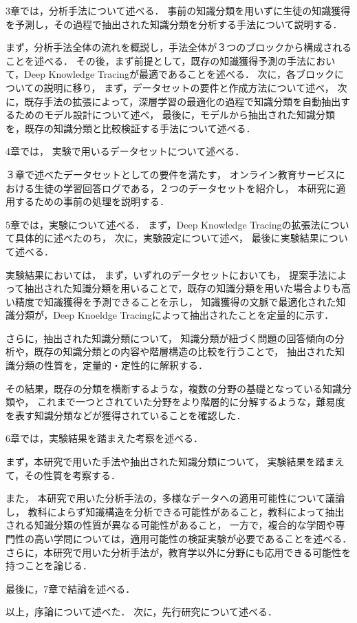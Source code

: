 3章では，分析手法について述べる．
事前の知識分類を用いずに生徒の知識獲得を予測し，その過程で抽出された知識分類を分析する手法について説明する．

まず，分析手法全体の流れを概説し，手法全体が３つのブロックから構成されることを述べる．
その後，まず前提として，既存の知識獲得予測の手法において，Deep Knowledge Tracingが最適であることを述べる．
次に，各ブロックについての説明に移り，
まず，データセットの要件と作成方法について述べ，
次に，既存手法の拡張によって，深層学習の最適化の過程で知識分類を自動抽出するためのモデル設計について述べ，
最後に，モデルから抽出された知識分類を，既存の知識分類と比較検証する手法について述べる．


4章では，
実験で用いるデータセットについて述べる．

３章で述べたデータセットとしての要件を満たす，
オンライン教育サービスにおける生徒の学習回答ログである，２つのデータセットを紹介し，
本研究に適用するための事前の処理を説明する．


5章では，実験について述べる．
まず，Deep Knowledge Tracingの拡張法について具体的に述べたのち，
次に，実験設定について述べ，
最後に実験結果について述べる．

実験結果においては，
まず，いずれのデータセットにおいても，
提案手法によって抽出された知識分類を用いることで，既存の知識分類を用いた場合よりも高い精度で知識獲得を予測できることを示し，
知識獲得の文脈で最適化された知識分類が，Deep Knoeldge Tracingによって抽出されたことを定量的に示す．

さらに，抽出された知識分類について，
知識分類が紐づく問題の回答傾向の分析や，既存の知識分類との内容や階層構造の比較を行うことで，
抽出された知識分類の性質を，定量的・定性的に解釈する．

その結果，既存の分類を横断するような，複数の分野の基礎となっている知識分類や，
これまで一つとされていた分野をより階層的に分解するような，難易度を表す知識分類などが獲得されていることを確認した．



6章では，実験結果を踏まえた考察を述べる．

まず，本研究で用いた手法や抽出された知識分類について，
実験結果を踏まえて，その性質を考察する．

また，
本研究で用いた分析手法の，多様なデータへの適用可能性について議論し，
教科によらず知識構造を分析できる可能性があること，教科によって抽出される知識分類の性質が異なる可能性があること，
一方で，複合的な学問や専門性の高い学問については，適用可能性の検証実験が必要であることを述べる．
さらに，本研究で用いた分析手法が，教育学以外に分野にも応用できる可能性を持つことを論じる．


最後に，7章で結論を述べる．



\vvspace
以上，序論について述べた．
次に，先行研究について述べる．


